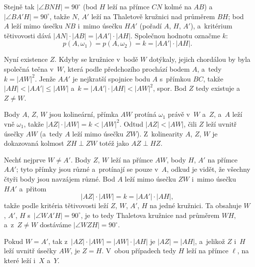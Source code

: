 {    Stejně tak $|\angle BNH| = 90^\circ$ (bod $H$ leží na přímce $CN$ kolmé na $AB$) a~$|\angle BA'H| = 90^\circ$, takže $N$, $A'$ leží na Thaletově kružnici nad průměrem $BH$; bod $A$ leží mimo úsečku $NB$ i~mimo úsečku $HA'$ (pořadí $A$, $H$, $A'$), a~kritérium tětivovosti dává $|AN| \cdot |AB| = |AA'| \cdot |AH|$. Společnou hodnotu označme $k$:
    $$
    p(A,\omega_1) = p(A,\omega_2) = k = |AA'| \cdot |AH|.
    $$

    Nyní existence $Z$. Kdyby se kružnice v~bodě $W$ dotýkaly, jejich chordálou by byla společná tečna v~$W$, která podle předchozího prochází bodem $A$, a~tedy $k = |AW|^2$. Jenže $AA'$ je nejkratší spojnice bodu $A$ s~přímkou $BC$, takže $|AH| < |AA'| \leq |AW|$ a~$k = |AA'| \cdot |AH| < |AW|^2$, spor. Bod $Z$ tedy existuje a~$Z \neq W$.

    Body $A$, $Z$, $W$ jsou kolineární, přímka $AW$ protíná $\omega_1$ právě v~$W$ a~$Z$, a~$A$ leží vně $\omega_1$, takže $|AZ| \cdot |AW| = k < |AW|^2$. Odtud $|AZ| < |AW|$, čili $Z$ leží uvnitř úsečky $AW$ (a~tedy $A$ leží mimo úsečku $ZW$). Z~kolinearity $A$, $Z$, $W$ je dokazovaná kolmost $ZH \perp ZW$ totéž jako $AZ \perp HZ$.

    Nechť nejprve $W \neq A'$. Body $Z$, $W$ leží na přímce $AW$, body $H$, $A'$ na přímce $AA'$; tyto přímky jsou různé a~protínají se pouze v~$A$, odkud je vidět, že všechny čtyři body jsou navzájem různé. Bod $A$ leží mimo úsečku $ZW$ i~mimo úsečku $HA'$ a~přitom
    $$
    |AZ| \cdot |AW| = k = |AA'| \cdot |AH|,
    $$
    takže podle kritéria tětivovosti leží $Z$, $W$, $A'$, $H$ na jedné kružnici. Ta obsahuje $W$, $A'$, $H$ s~$|\angle WA'H| = 90^\circ$, je to tedy Thaletova kružnice nad průměrem $WH$, a~z~$Z \neq W$ dostáváme $|\angle WZH| = 90^\circ$.

    Pokud $W = A'$, tak z~$|AZ| \cdot |AW| = |AW| \cdot |AH|$ je $|AZ| = |AH|$, a~jelikož $Z$ i~$H$ leží uvnitř úsečky $AW$, je $Z = H$. V~obou případech tedy $H$ leží na přímce $\ell$, na které leží i~$X$ a~$Y$.
}

